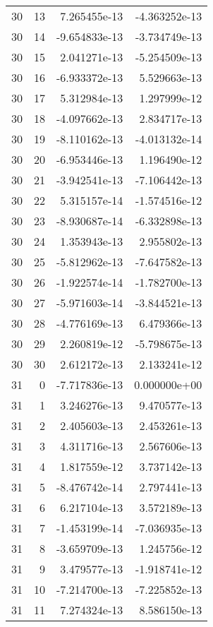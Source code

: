 \begin{tabular}{rrrr}
  30 &   13 &  7.265455e-13 & -4.363252e-13 \\
  30 &   14 & -9.654833e-13 & -3.734749e-13 \\
  30 &   15 &  2.041271e-13 & -5.254509e-13 \\
  30 &   16 & -6.933372e-13 &  5.529663e-13 \\
  30 &   17 &  5.312984e-13 &  1.297999e-12 \\
  30 &   18 & -4.097662e-13 &  2.834717e-13 \\
  30 &   19 & -8.110162e-13 & -4.013132e-14 \\
  30 &   20 & -6.953446e-13 &  1.196490e-12 \\
  30 &   21 & -3.942541e-13 & -7.106442e-13 \\
  30 &   22 &  5.315157e-14 & -1.574516e-12 \\
  30 &   23 & -8.930687e-14 & -6.332898e-13 \\
  30 &   24 &  1.353943e-13 &  2.955802e-13 \\
  30 &   25 & -5.812962e-13 & -7.647582e-13 \\
  30 &   26 & -1.922574e-14 & -1.782700e-13 \\
  30 &   27 & -5.971603e-14 & -3.844521e-13 \\
  30 &   28 & -4.776169e-13 &  6.479366e-13 \\
  30 &   29 &  2.260819e-12 & -5.798675e-13 \\
  30 &   30 &  2.612172e-13 &  2.133241e-12 \\
  31 &    0 & -7.717836e-13 &  0.000000e+00 \\
  31 &    1 &  3.246276e-13 &  9.470577e-13 \\
  31 &    2 &  2.405603e-13 &  2.453261e-13 \\
  31 &    3 &  4.311716e-13 &  2.567606e-13 \\
  31 &    4 &  1.817559e-12 &  3.737142e-13 \\
  31 &    5 & -8.476742e-14 &  2.797441e-13 \\
  31 &    6 &  6.217104e-13 &  3.572189e-13 \\
  31 &    7 & -1.453199e-14 & -7.036935e-13 \\
  31 &    8 & -3.659709e-13 &  1.245756e-12 \\
  31 &    9 &  3.479577e-13 & -1.918741e-12 \\
  31 &   10 & -7.214700e-13 & -7.225852e-13 \\
  31 &   11 &  7.274324e-13 &  8.586150e-13 \\

\end{tabular}
